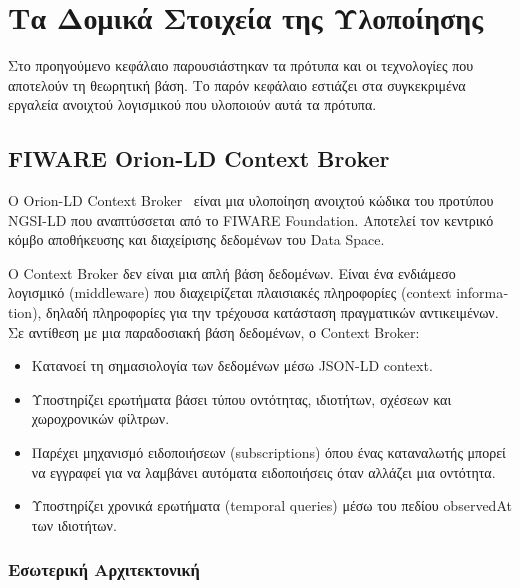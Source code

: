 \chapter{Τα Δομικά Στοιχεία της Υλοποίησης}
\label{ch:building-blocks}

Στο προηγούμενο κεφάλαιο παρουσιάστηκαν τα πρότυπα και οι τεχνολογίες που
αποτελούν τη θεωρητική βάση. Το παρόν κεφάλαιο εστιάζει στα συγκεκριμένα
εργαλεία ανοιχτού λογισμικού που υλοποιούν αυτά τα πρότυπα.

\section{\textlatin{FIWARE Orion-LD Context Broker}}
\label{sec:orion-ld}

Ο \textlatin{Orion-LD Context Broker}~\cite{orion-ld2023} είναι μια
υλοποίηση ανοιχτού κώδικα του προτύπου \textlatin{NGSI-LD} που
αναπτύσσεται από το \textlatin{FIWARE Foundation}. Αποτελεί τον κεντρικό
κόμβο αποθήκευσης και διαχείρισης δεδομένων του \textlatin{Data Space}.

Ο \textlatin{Context Broker} δεν είναι μια απλή βάση δεδομένων. Είναι
ένα ενδιάμεσο λογισμικό (\textlatin{middleware}) που διαχειρίζεται
πλαισιακές πληροφορίες (\textlatin{context information}), δηλαδή
πληροφορίες για την τρέχουσα κατάσταση πραγματικών αντικειμένων. Σε
αντίθεση με μια παραδοσιακή βάση δεδομένων, ο \textlatin{Context Broker}:

\begin{itemize}
    \item Κατανοεί τη σημασιολογία των δεδομένων μέσω \textlatin{JSON-LD
    context}.
    \item Υποστηρίζει ερωτήματα βάσει τύπου οντότητας, ιδιοτήτων,
    σχέσεων και χωροχρονικών φίλτρων.
    \item Παρέχει μηχανισμό ειδοποιήσεων (\textlatin{subscriptions}) όπου
    ένας καταναλωτής μπορεί να εγγραφεί για να λαμβάνει αυτόματα
    ειδοποιήσεις όταν αλλάζει μια οντότητα.
    \item Υποστηρίζει χρονικά ερωτήματα (\textlatin{temporal queries})
    μέσω του πεδίου \textlatin{observedAt} των ιδιοτήτων.
\end{itemize}

\subsection{Εσωτερική Αρχιτεκτονική}
\label{subsec:orion-internals}

